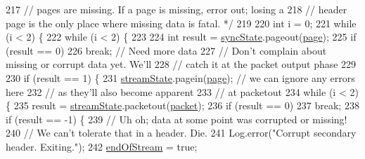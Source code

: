 \begin{DoxyCode}
217         \textcolor{comment}{// pages are missing.  If a page is missing, error out; losing a}
218         \textcolor{comment}{// header page is the only place where missing data is fatal. */}
219 
220         \textcolor{keywordtype}{int} i = 0;
221         \textcolor{keywordflow}{while} (i < 2) \{
222             \textcolor{keywordflow}{while} (i < 2) \{
223 
224                 \textcolor{keywordtype}{int} result = \mbox{\hyperlink{classorg_1_1newdawn_1_1slick_1_1openal_1_1_ogg_input_stream_a6cf0c439e1258dd57e8e83b52b76aefd}{syncState}}.pageout(\mbox{\hyperlink{classorg_1_1newdawn_1_1slick_1_1openal_1_1_ogg_input_stream_a1550384d82ddda332e721b907beb3c66}{page}});
225                 \textcolor{keywordflow}{if} (result == 0)
226                     \textcolor{keywordflow}{break}; \textcolor{comment}{// Need more data}
227                 \textcolor{comment}{// Don't complain about missing or corrupt data yet.  We'll}
228                 \textcolor{comment}{// catch it at the packet output phase}
229 
230                 \textcolor{keywordflow}{if} (result == 1) \{
231                     \mbox{\hyperlink{classorg_1_1newdawn_1_1slick_1_1openal_1_1_ogg_input_stream_ac4bb8d3c4bd796cf4f20b21fdad304c0}{streamState}}.pagein(\mbox{\hyperlink{classorg_1_1newdawn_1_1slick_1_1openal_1_1_ogg_input_stream_a1550384d82ddda332e721b907beb3c66}{page}}); \textcolor{comment}{// we can ignore any errors here}
232                     \textcolor{comment}{// as they'll also become apparent}
233                     \textcolor{comment}{// at packetout}
234                     \textcolor{keywordflow}{while} (i < 2) \{
235                         result = \mbox{\hyperlink{classorg_1_1newdawn_1_1slick_1_1openal_1_1_ogg_input_stream_ac4bb8d3c4bd796cf4f20b21fdad304c0}{streamState}}.packetout(\mbox{\hyperlink{classorg_1_1newdawn_1_1slick_1_1openal_1_1_ogg_input_stream_a926c6e76df40d3920cf3801c39bd7c89}{packet}});
236                         \textcolor{keywordflow}{if} (result == 0)
237                             \textcolor{keywordflow}{break};
238                         \textcolor{keywordflow}{if} (result == -1) \{
239                             \textcolor{comment}{// Uh oh; data at some point was corrupted or missing!}
240                             \textcolor{comment}{// We can't tolerate that in a header.  Die.}
241                             Log.error(\textcolor{stringliteral}{"Corrupt secondary header.  Exiting."});
242                             \mbox{\hyperlink{classorg_1_1newdawn_1_1slick_1_1openal_1_1_ogg_input_stream_ac4c417186feeb02c3cd3ecfedee09831}{endOfStream}} = \textcolor{keyword}{true};

\end{DoxyCode}
